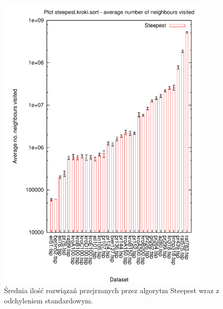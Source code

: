 \begin{figure}
\begin{center}
\includegraphics[width=0.9\textwidth]{wykresy/steepest_sasiedzi}
\end{center}
\caption{Średnia ilość rozwiązań przejrzanych przez algorytm Steepest wraz z odchyleniem standardowym.}
\label{steepest_sasiedzi}
\end{figure}

